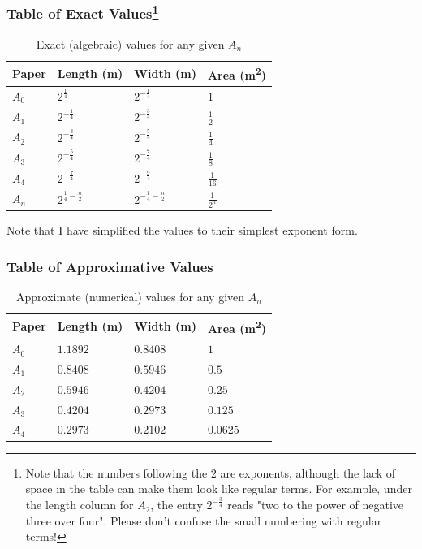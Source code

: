 \subsubsection*{Table of Exact Values\footnote{Note that the numbers following the $2$ are exponents, although the lack of space in the table can make them look like regular terms. For example, under the length column for $A_2$, the entry $2^{-\frac{3}{4}}$ reads "two to the power of negative three over four". Please don't confuse the small numbering with regular terms!}}
\begin{table}[H]
  \centering\makegapedcells
  \begin{tabular}{@{}llll@{}}
    \toprule
    Paper & Length (\si{\meter}) & Width (\si{\meter}) & Area (\si{\meter\squared}) \\ \midrule
    $A_0$ & $2^{\frac{1}{4}}$     & $2^{-\frac{1}{4}}$  & $1$     \\
    $A_1$ & $2^{-\frac{1}{4}}$    & $2^{-\frac{3}{4}}$  & $\frac{1}{2}$     \\
    $A_2$ & $2^{-\frac{3}{4}}$    & $2^{-\frac{5}{4}}$  & $\frac{1}{4}$     \\
    $A_3$ & $2^{-\frac{5}{4}}$    & $2^{-\frac{7}{4}}$  & $\frac{1}{8}$     \\
    $A_4$ & $2^{-\frac{7}{4}}$    & $2^{-\frac{9}{4}}$  & $\frac{1}{16}$    \\
    $A_n$ & $2^{\frac{1}{4} - \frac{n}{2}}$    & $2^{-\frac{1}{4} - \frac{n}{2}}$  & $\frac{1}{2^n}$    \\
    \bottomrule
  \end{tabular}
  \caption{Exact (algebraic) values for any given $A_n$}
  \label{tab:exact}
\end{table}

\noindent
Note that I have simplified the values to their simplest exponent form.

\subsubsection*{Table of Approximative Values}
\begin{table}[H]
  \centering\makegapedcells
  \begin{tabular}{@{}llll@{}}
    \toprule
    Paper & Length (\si{\meter}) & Width (\si{\meter}) & Area (\si{\meter\squared}) \\ \midrule
    $A_0$ & $1.1892$       & $0.8408$      & $1$      \\
    $A_1$ & $0.8408$       & $0.5946$      & $0.5$    \\
    $A_2$ & $0.5946$       & $0.4204$      & $0.25$   \\
    $A_3$ & $0.4204$       & $0.2973$      & $0.125$  \\
    $A_4$ & $0.2973$       & $0.2102$      & $0.0625$ \\ \bottomrule
  \end{tabular}
  \caption{Approximate (numerical) values for any given $A_n$}
  \label{tab:approx}
\end{table}

